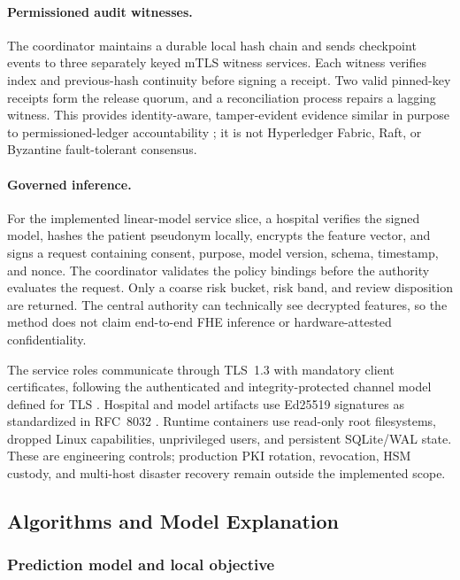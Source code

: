 \paragraph{Permissioned audit witnesses.}
The coordinator maintains a durable local hash chain and sends checkpoint events to three separately keyed mTLS witness services. Each witness verifies index and previous-hash continuity before signing a receipt. Two valid pinned-key receipts form the release quorum, and a reconciliation process repairs a lagging witness. This provides identity-aware, tamper-evident evidence similar in purpose to permissioned-ledger accountability \cite{androulaki2018hyperledger}; it is not Hyperledger Fabric, Raft, or Byzantine fault-tolerant consensus.

\paragraph{Governed inference.}
For the implemented linear-model service slice, a hospital verifies the signed model, hashes the patient pseudonym locally, encrypts the feature vector, and signs a request containing consent, purpose, model version, schema, timestamp, and nonce. The coordinator validates the policy bindings before the authority evaluates the request. Only a coarse risk bucket, risk band, and review disposition are returned. The central authority can technically see decrypted features, so the method does not claim end-to-end FHE inference or hardware-attested confidentiality.

The service roles communicate through TLS~1.3 with mandatory client certificates, following the authenticated and integrity-protected channel model defined for TLS \cite{rescorla2018tls}. Hospital and model artifacts use Ed25519 signatures as standardized in RFC~8032 \cite{josefsson2017eddsa}. Runtime containers use read-only root filesystems, dropped Linux capabilities, unprivileged users, and persistent SQLite/WAL state. These are engineering controls; production PKI rotation, revocation, HSM custody, and multi-host disaster recovery remain outside the implemented scope.

\subsection{Algorithms and Model Explanation}
\label{subsec:algorithms-model}

\subsubsection{Prediction model and local objective}

